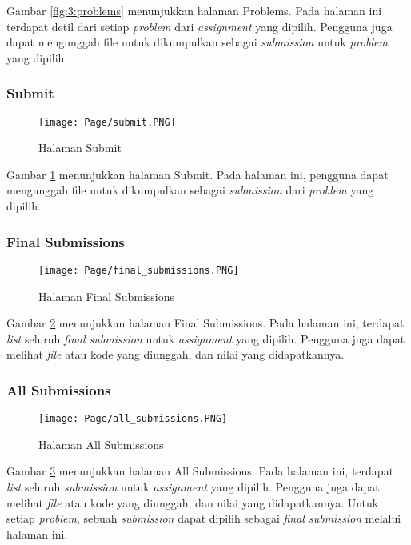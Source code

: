     Gambar \ref{fig:3:problems} menunjukkan halaman Problems. Pada halaman ini terdapat detil dari setiap \textit{problem} dari \textit{assignment} yang dipilih. Pengguna juga dapat mengunggah file untuk dikumpulkan sebagai \textit{submission} untuk \textit{problem} yang dipilih.
    
\subsubsection{Submit}
    \begin{figure}[H]
    	\centering  
    	\texttt{[image: Page/submit.PNG]}  
    	\caption{Halaman Submit}
    	\label{fig:3:submit} 
    \end{figure} 
    
    Gambar \ref{fig:3:submit} menunjukkan halaman Submit. Pada halaman ini, pengguna dapat mengunggah file untuk dikumpulkan sebagai \textit{submission} dari \textit{problem} yang dipilih.

\subsubsection{Final Submissions}
    \begin{figure}[H]
    	\centering  
    	\texttt{[image: Page/final\_submissions.PNG]}  
    	\caption{Halaman Final Submissions}
    	\label{fig:3:final_submissions} 
    \end{figure} 
    
    Gambar \ref{fig:3:final_submissions} menunjukkan halaman Final Submissions. Pada halaman ini, terdapat \textit{list} seluruh \textit{final submission} untuk \textit{assignment} yang dipilih. Pengguna juga dapat melihat \textit{file} atau kode yang diunggah, dan nilai yang didapatkannya.
    
\subsubsection{All Submissions}
    \begin{figure}[H]
    	\centering  
    	\texttt{[image: Page/all\_submissions.PNG]}  
    	\caption{Halaman All Submissions}
    	\label{fig:3:all_submissions} 
    \end{figure} 
    
    Gambar \ref{fig:3:all_submissions} menunjukkan halaman All Submissions. Pada halaman ini, terdapat \textit{list} seluruh \textit{submission} untuk \textit{assignment} yang dipilih. Pengguna juga dapat melihat \textit{file} atau kode yang diunggah, dan nilai yang didapatkannya. Untuk setiap \textit{problem}, sebuah \textit{submission} dapat dipilih sebagai \textit{final submission} melalui halaman ini.
    
